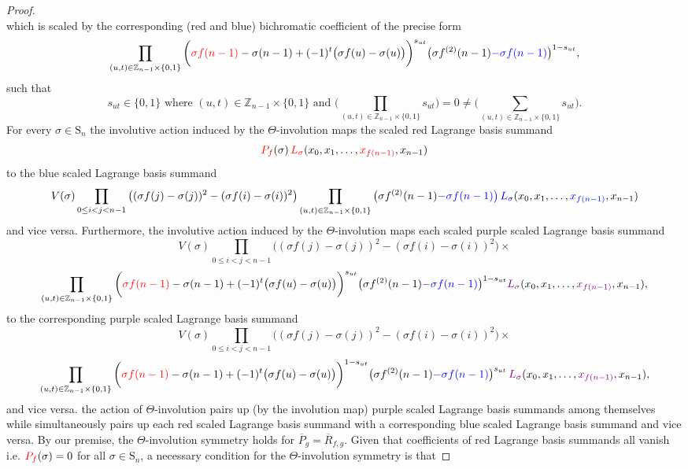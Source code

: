 \begin{proof}
\[\]
which is scaled by the corresponding (red and blue) bichromatic coefficient of the precise form
\[
\prod_{(u,t)\in\mathbb{Z}_{n-1}\times\{0,1\}}\bigg({\color{red}\sigma f(n-1)}-\sigma(n-1)+(-1)^{t}\big(\sigma f(u)-\sigma(u)\big)\bigg)^{s_{ut}}\big(\sigma f^{(2)}(n-1){\color{blue}-\sigma f(n-1)}\big)^{1-s_{ut}},
\]
such that
\[
s_{ut}\in\{0,1\}\text{ where }(u,t)\in\mathbb{Z}_{n-1}\times\{0,1\}\text{ and }\bigg(\prod_{(u,t)\in\mathbb{Z}_{n-1}\times\{0,1\}}s_{ut}\bigg)=0\ne\bigg(\sum_{(u,t)\in\mathbb{Z}_{n-1}\times\{0,1\}}s_{ut}\bigg).
\]
For every $\sigma\in\text{S}_{n}$ the involutive action induced by the $\Theta$-involution maps the scaled red Lagrange basis summand
\[
{\color{red}P_{f}}(\sigma)\,{\color{red}L_{\sigma}}(x_{0},x_{1},\ldots,{\color{red}x_{f(n-1)}},x_{n-1})
\]
to the blue scaled Lagrange basis summand
\[
V(\sigma)\prod_{0\le i<j<n-1}\big((\sigma f(j)-\sigma(j))^{2}-(\sigma f(i)-\sigma(i))^{2}\big)\prod_{(u,t)\in\mathbb{Z}_{n-1}\times\{0,1\}}\big(\sigma f^{(2)}(n-1){\color{blue}-\sigma f(n-1)}{\color{blue}\big)}\,{\color{blue}L_{\sigma}}(x_{0},x_{1},\ldots,{\color{blue}x_{f(n-1)}},x_{n-1})
\]
and vice versa. Furthermore, the involutive action induced by the $\Theta$-involution maps each scaled purple scaled Lagrange basis summand
\[
V(\sigma)\prod_{0\le i<j<n-1}\big((\sigma f(j)-\sigma(j))^{2}-(\sigma f(i)-\sigma(i))^{2}\big)\times
\]
\[
\prod_{(u,t)\in\mathbb{Z}_{n-1}\times\{0,1\}}\bigg({\color{red}\sigma f(n-1)}-\sigma(n-1)+(-1)^{t}\big(\sigma f(u)-\sigma(u)\big)\bigg)^{s_{ut}}\big(\sigma f^{(2)}(n-1){\color{blue}-\sigma f(n-1)}\big)^{1-s_{ut}}{\color{violet}L_{\sigma}}(x_{0},x_{1},\ldots,{\color{violet}x_{f(n-1)}},x_{n-1}),
\]
to the corresponding purple scaled Lagrange basis summand
\[
V(\sigma)\prod_{0\le i<j<n-1}\big((\sigma f(j)-\sigma(j))^{2}-(\sigma f(i)-\sigma(i))^{2}\big)\times
\]
\[
\prod_{(u,t)\in\mathbb{Z}_{n-1}\times\{0,1\}}\bigg({\color{red}\sigma f(n-1)}-\sigma(n-1)+(-1)^{t}\big(\sigma f(u)-\sigma(u)\big)\bigg)^{1-s_{ut}}\big(\sigma f^{(2)}(n-1){\color{blue}-\sigma f(n-1)}\big)^{s_{ut}}\,{\color{violet}L_{\sigma}}(x_{0},x_{1},\ldots,{\color{violet}x_{f(n-1)}},x_{n-1}),
\]
and vice versa. the action of $\Theta$-involution pairs up (by the involution map) purple scaled Lagrange basis summands among themselves while simultaneously pairs up each red scaled Lagrange basis summand with a corresponding blue scaled Lagrange basis summand and vice versa. By our premise, the $\Theta$-involution symmetry holds for $\overline{P}_{g}=\overline{R}_{f,g}$. Given that coefficients of red Lagrange basis summands all vanish i.e. ${\color{red}P_{f}}(\sigma)=0$ for all $\sigma\in\text{S}_{n}$, a necessary condition for the $\Theta$-involution symmetry is that

\end{proof}
